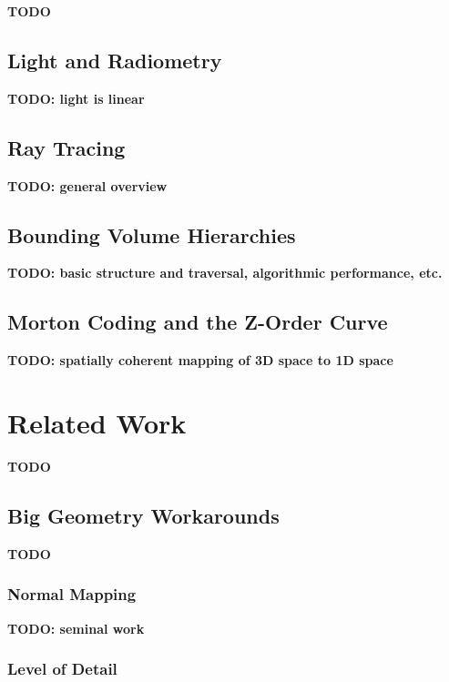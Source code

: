\documentclass[12pt]{ucthesis}
\begin{document}
\textbf{TODO}

\section{Light and Radiometry}
\label{radiometry}

\textbf{TODO: light is linear}

\section{Ray Tracing}
\label{raytracing}

\textbf{TODO: general overview}

\section{Bounding Volume Hierarchies}
\label{bvhs}

\textbf{TODO: basic structure and traversal, algorithmic performance, etc.}

\section{Morton Coding and the Z-Order Curve}
\label{mortoncoding}

\textbf{TODO: spatially coherent mapping of 3D space to 1D space}

\chapter{Related Work}
\label{relatedwork}

\textbf{TODO}

\section{Big Geometry Workarounds}
\label{managingcomplexity}

\textbf{TODO}

\subsection{Normal Mapping}
\label{normalmaps}

\textbf{TODO: seminal work}

\subsection{Level of Detail}
\label{levelofdetail}
\end{document}
